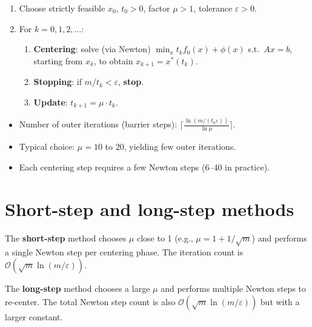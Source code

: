 \begin{algorithme}[title=\textbf{Barrier Method}]
\begin{enumerate}
  \item Choose strictly feasible $x_0$, $t_0 > 0$, factor $\mu > 1$,
        tolerance $\varepsilon > 0$.
  \item For $k = 0, 1, 2, \ldots$:
    \begin{enumerate}
      \item \textbf{Centering}: solve (via Newton)
            $\min_x t_k f_0(x) + \phi(x)$ s.t.\ $Ax = b$,
            starting from $x_k$, to obtain $x_{k+1} = x^*(t_k)$.
      \item \textbf{Stopping}: if $m / t_k < \varepsilon$, \textbf{stop}.
      \item \textbf{Update}: $t_{k+1} = \mu \cdot t_k$.
    \end{enumerate}
\end{enumerate}
\end{algorithme}

\begin{keyformulas}[title=\textbf{Barrier method complexity}]
\begin{itemize}
  \item Number of outer iterations (barrier steps):
        $\lceil \frac{\ln(m / (t_0 \varepsilon))}{\ln \mu} \rceil$.
  \item Typical choice: $\mu = 10$ to $20$, yielding few outer iterations.
  \item Each centering step requires a few Newton steps (6--40 in practice).
\end{itemize}
\end{keyformulas}

\section{Short-step and long-step methods}

\begin{definition}
The \textbf{short-step} method chooses $\mu$ close to 1 (e.g.,
$\mu = 1 + 1/\sqrt{m}$) and performs a single Newton step per centering
phase. The iteration count is $\mathcal{O}(\sqrt{m} \ln(m/\varepsilon))$.
\end{definition}

\begin{definition}
The \textbf{long-step} method chooses a large $\mu$ and performs multiple
Newton steps to re-center. The total Newton step count is also
$\mathcal{O}(\sqrt{m} \ln(m/\varepsilon))$ but with a larger constant.
\end{definition}

